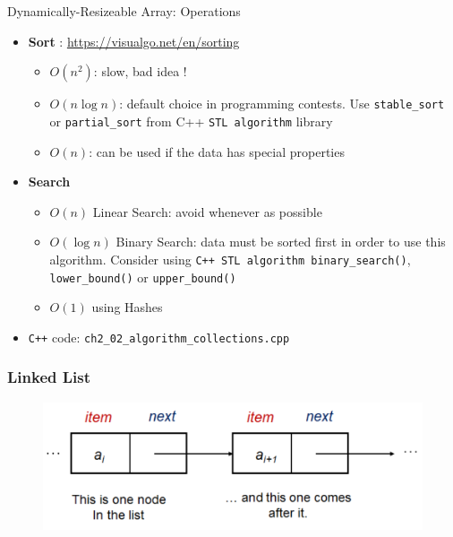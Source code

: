 \documentclass{beamer}
\begin{document}
\begin{frame}[fragile]{Dynamically-Resizeable Array: Operations}
    \begin{itemize}
        \item \textbf{Sort} : \url{https://visualgo.net/en/sorting}
            \begin{itemize}
                \item $O(n^2)$: slow, bad idea ! 
                \item $O(n\log n)$: default choice in programming contests. Use \verb|stable_sort| or \verb|partial_sort| from C++ \verb|STL algorithm| library
                \item $O(n)$: can be used if the data has special properties
            \end{itemize}
        \item \textbf{Search}
            \begin{itemize}
                \item $O(n)$ Linear Search: avoid whenever as possible
                \item $O(\log n)$ Binary Search: data must be sorted first in order to use this algorithm. Consider using \verb|C++ STL algorithm binary_search()|, \verb|lower_bound()| or \verb|upper_bound()|
                \item $O(1)$ using Hashes
            \end{itemize}
        \item \color{red}\verb|C++| code: \verb|ch2_02_algorithm_collections.cpp|\color{black}
    \end{itemize}
\end{frame}

\begin{frame}[fragile]
\frametitle{Linked List}
	\begin{figure}
		\centering
		\includegraphics[scale=0.5]{imgs/2-LDS/linked-list/linked-list.png}
	\end{figure}	
\end{frame}
\end{document}
